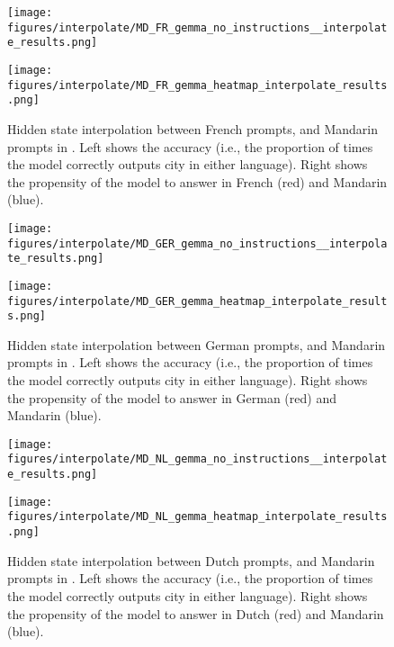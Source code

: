 \begin{figure}[h]
\begin{minipage}{0.49\textwidth}
    \centering
    \texttt{[image: figures/interpolate/MD\_FR\_gemma\_no\_instructions\_\_interpolate\_results.png]} 
\end{minipage}
\begin{minipage}{0.49\textwidth}
    \centering
    \texttt{[image: figures/interpolate/MD\_FR\_gemma\_heatmap\_interpolate\_results.png]} 
\end{minipage}
\caption{Hidden state interpolation between French prompts, and Mandarin prompts in \mistral. Left shows the accuracy (i.e., the proportion of times the model correctly outputs city in either language). Right shows the propensity of the model to answer in French (red) and Mandarin (blue). }
\end{figure}

\begin{figure}[h]
\begin{minipage}{0.49\textwidth}
    \centering
    \texttt{[image: figures/interpolate/MD\_GER\_gemma\_no\_instructions\_\_interpolate\_results.png]} 
\end{minipage}
\begin{minipage}{0.49\textwidth}
    \centering
    \texttt{[image: figures/interpolate/MD\_GER\_gemma\_heatmap\_interpolate\_results.png]} 
\end{minipage}
\caption{Hidden state interpolation between German prompts, and Mandarin prompts in \mistral. Left shows the accuracy (i.e., the proportion of times the model correctly outputs city in either language). Right shows the propensity of the model to answer in German (red) and Mandarin (blue). }
\end{figure}

\begin{figure}[h]
\begin{minipage}{0.49\textwidth}
    \centering
    \texttt{[image: figures/interpolate/MD\_NL\_gemma\_no\_instructions\_\_interpolate\_results.png]} 
\end{minipage}
\begin{minipage}{0.49\textwidth}
    \centering
    \texttt{[image: figures/interpolate/MD\_NL\_gemma\_heatmap\_interpolate\_results.png]} 
\end{minipage}
\caption{Hidden state interpolation between Dutch prompts, and Mandarin prompts in \mistral. Left shows the accuracy (i.e., the proportion of times the model correctly outputs city in either language). Right shows the propensity of the model to answer in Dutch (red) and Mandarin (blue). }
\end{figure}